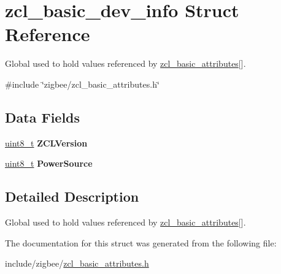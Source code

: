 \hypertarget{structzcl__basic__dev__info}{}\section{zcl\+\_\+basic\+\_\+dev\+\_\+info Struct Reference}
\label{structzcl__basic__dev__info}


Global used to hold values referenced by \hyperlink{group__zcl__basic_ga721ebe2f6ae346632475cf178671d150}{zcl\+\_\+basic\+\_\+attributes}\mbox{[}\mbox{]}.  




{\ttfamily \#include \char`\"{}zigbee/zcl\+\_\+basic\+\_\+attributes.\+h\char`\"{}}

\subsection*{Data Fields}
\begin{DoxyCompactItemize}
\item 
\hyperlink{group__hal__dos_gae1affc9ca37cfb624959c866a73f83c2}{uint8\+\_\+t} {\bfseries Z\+C\+L\+Version}
\item 
\hyperlink{group__hal__dos_gae1affc9ca37cfb624959c866a73f83c2}{uint8\+\_\+t} {\bfseries Power\+Source}
\end{DoxyCompactItemize}


\subsection{Detailed Description}
Global used to hold values referenced by \hyperlink{group__zcl__basic_ga721ebe2f6ae346632475cf178671d150}{zcl\+\_\+basic\+\_\+attributes}\mbox{[}\mbox{]}. 

The documentation for this struct was generated from the following file\+:\begin{DoxyCompactItemize}
\item 
include/zigbee/\hyperlink{zcl__basic__attributes_8h}{zcl\+\_\+basic\+\_\+attributes.\+h}\end{DoxyCompactItemize}
